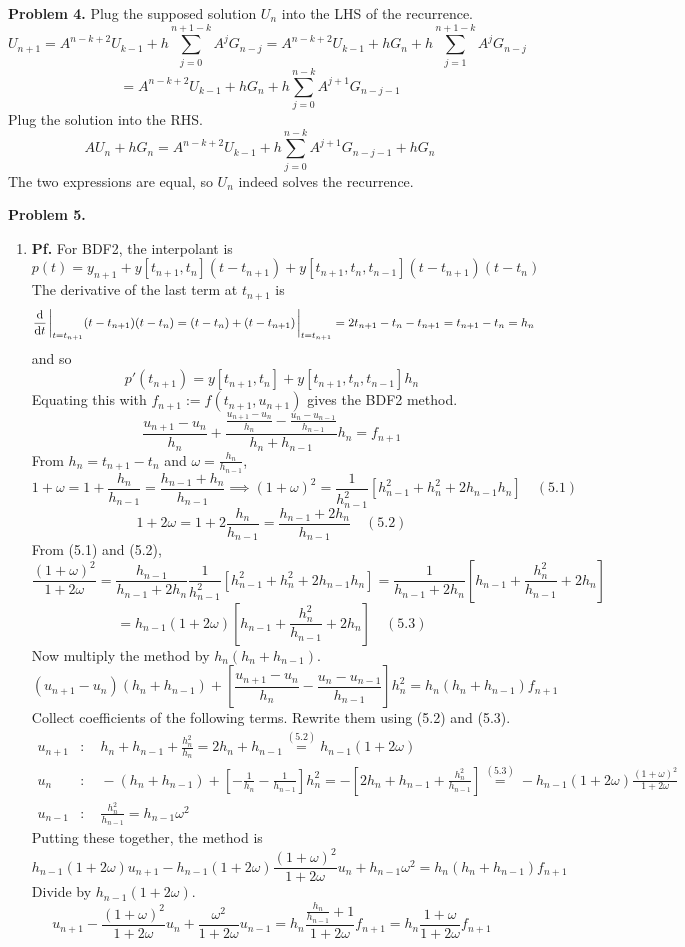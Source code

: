 \documentclass{article}
\def\tbf#1{\textbf{#1}}
\newcommand{\sbr}[1]{\left[#1\right]}
\newcommand{\pf}{\tbf{Pf. }}
\newcommand{\imp}{\implies}
\newcommand{\sep}[1][.5cm]{\vspace{#1}}
\newcommand{\om}{\omega}
\begin{document}
\tbf{Problem 4.} Plug the supposed solution $U_n$ into the LHS of the recurrence.
$$U_{n+1} = A^{n-k+2}U_{k-1} + h\sum_{j=0}^{n+1-k}A^jG_{n-j}
= A^{n-k+2}U_{k-1} + hG_n + h\sum_{j=1}^{n+1-k}A^jG_{n-j}$$
$$= A^{n-k+2}U_{k-1} + hG_n + h\sum_{j=0}^{n-k}A^{j+1}G_{n-j-1}$$
Plug the solution into the RHS.
$$AU_n + hG_n = A^{n-k+2}U_{k-1} + h\sum_{j=0}^{n-k}A^{j+1}G_{n-j-1} + hG_n$$
The two expressions are equal, so $U_n$ indeed solves the recurrence.
\sep



\tbf{Problem 5.}

\begin{enumerate}[label=(\alph*)]
	
\item \pf For BDF2, the interpolant is
$$p(t) = y_{n+1} + y[t_{n+1},t_n](t-t_{n+1}) + y[t_{n+1},t_n,t_{n-1}](t-t_{n+1})(t-t_n)$$
The derivative of the last term at $t_{n+1}$ is
$$\dv{t}\eval_{t=t_{n+1}} (t-t_{n+1})(t-t_n)
= (t-t_{n})+(t-t_{n+1})\eval_{t=t_{n+1}}
= 2t_{n+1}-t_{n}-t_{n+1}
= t_{n+1}-t_n
= h_n$$
and so
$$p'(t_{n+1}) = y[t_{n+1},t_n] + y[t_{n+1},t_n,t_{n-1}]h_n$$
Equating this with $f_{n+1}:=f(t_{n+1},u_{n+1})$ gives the BDF2 method.
$$\frac{u_{n+1}-u_n}{h_n} + \frac{\frac{u_{n+1}-u_n}{h_n} - \frac{u_n-u_{n-1}}{h_{n-1}}}{h_n+h_{n-1}}h_n = f_{n+1}$$
From $h_n=t_{n+1}-t_n$ and $\om=\frac{h_n}{h_{n-1}}$,
$$1 + \om = 1 + \frac{h_n}{h_{n-1}} = \frac{h_{n-1}+h_n}{h_{n-1}}
\imp (1+\om)^2 = \frac{1}{h_{n-1}^2}\sbr{h_{n-1}^2+h_n^2+2h_{n-1}h_n} \quad (5.1)$$
$$1 + 2\om = 1 + 2\frac{h_n}{h_{n-1}} = \frac{h_{n-1}+2h_n}{h_{n-1}} \quad (5.2)$$
From (5.1) and (5.2),
$$\frac{(1+\om)^2}{1+2\om} = \frac{h_{n-1}}{h_{n-1}+2h_n}\frac{1}{h_{n-1}^2}\sbr{h_{n-1}^2+h_n^2+2h_{n-1}h_n}
= \frac{1}{h_{n-1}+2h_n}\sbr{h_{n-1}+\frac{h_n^2}{h_{n-1}}+2h_n}$$
$$= h_{n-1}(1+2\om)\sbr{h_{n-1}+\frac{h_n^2}{h_{n-1}}+2h_n} \quad (5.3)$$
Now multiply the method by $h_n(h_n+h_{n-1})$.
$$(u_{n+1}-u_n)(h_n+h_{n-1}) + \sbr{\frac{u_{n+1}-u_n}{h_n} - \frac{u_n-u_{n-1}}{h_{n-1}}}h_n^2 = h_n(h_n+h_{n-1})f_{n+1}$$
Collect coefficients of the following terms. Rewrite them using (5.2) and (5.3).
\begin{align*}
	u_{n+1} &: \quad h_n + h_{n-1} + \frac{h_n^2}{h_n} = 2h_n + h_{n-1} \overset{(5.2)}{=} h_{n-1}(1+2\om) \\
	u_n &: \quad -(h_n + h_{n-1}) + \sbr{-\frac{1}{h_n} - \frac{1}{h_{n-1}}}h_n^2 = -\sbr{2h_n + h_{n-1} + \frac{h_n^2}{h_{n-1}}} \overset{(5.3)}{=} -h_{n-1}(1+2\om)\frac{(1+\om)^2}{1+2\om} \\
	u_{n-1} &: \quad \frac{h_n^2}{h_{n-1}} = h_{n-1}\om^2
\end{align*}
Putting these together, the method is
$$h_{n-1}(1+2\om)u_{n+1} - h_{n-1}(1+2\om)\frac{(1+\om)^2}{1+2\om}u_n + h_{n-1}\om^2 = h_n(h_n+h_{n-1})f_{n+1}$$
Divide by $h_{n-1}(1+2\om)$.
$$u_{n+1} - \frac{(1+\om)^2}{1+2\om}u_n + \frac{\om^2}{1+2\om}u_{n-1} = h_n\frac{\frac{h_n}{h_{n-1}}+1}{1+2\om}f_{n+1}
= h_n\frac{1+\om}{1+2\om}f_{n+1}$$



\end{enumerate}
\end{document}
